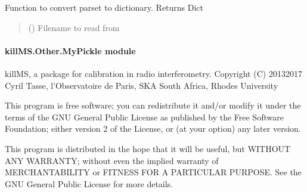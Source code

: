 \documentclass[letterpaper,10pt,english]{sphinxmanual}
\begin{document}

\begin{fulllineitems}
\label{\detokenize{api/killMS.Other:killMS.Other.ModParsetType.ParsetToDict}}
\pysigstartsignatures
{}
\pysigstopsignatures
\sphinxAtStartPar
Function to convert parset to dictionary.
Returns Dict
\begin{quote}\begin{description}
\sphinxAtStartPar
{} () \textendash{} Filename to read from

\sphinxAtStartPar
{}

\end{description}\end{quote}

\end{fulllineitems}



\paragraph{killMS.Other.MyPickle module}
\label{\detokenize{api/killMS.Other:module-killMS.Other.MyPickle}}\label{\detokenize{api/killMS.Other:killms-other-mypickle-module}}
\sphinxAtStartPar
killMS, a package for calibration in radio interferometry.
Copyright (C) 2013\sphinxhyphen{}2017  Cyril Tasse, l’Observatoire de Paris,
SKA South Africa, Rhodes University

\sphinxAtStartPar
This program is free software; you can redistribute it and/or
modify it under the terms of the GNU General Public License
as published by the Free Software Foundation; either version 2
of the License, or (at your option) any later version.

\sphinxAtStartPar
This program is distributed in the hope that it will be useful,
but WITHOUT ANY WARRANTY; without even the implied warranty of
MERCHANTABILITY or FITNESS FOR A PARTICULAR PURPOSE.  See the
GNU General Public License for more details.
\end{document}
